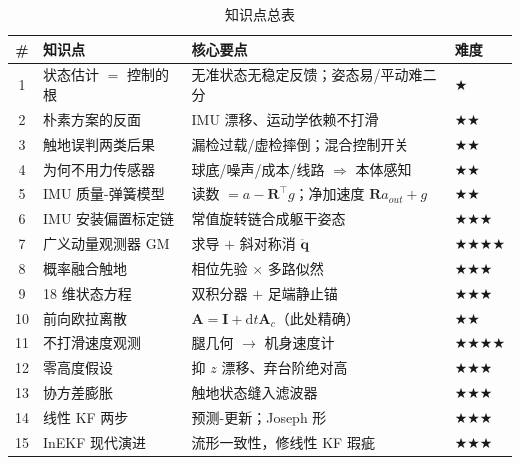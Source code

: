 \begin{table}[H]\centering\small
\caption{知识点总表}
\begin{tabular}{clll}
\toprule
\# & 知识点 & 核心要点 & 难度 \\
\midrule
1 & 状态估计 $=$ 控制的根 & 无准状态无稳定反馈；姿态易/平动难二分 & \(\bigstar\) \\
2 & 朴素方案的反面 & IMU 漂移、运动学依赖不打滑 & \(\bigstar\bigstar\) \\
3 & 触地误判两类后果 & 漏检过载/虚检摔倒；混合控制开关 & \(\bigstar\bigstar\) \\
4 & 为何不用力传感器 & 球底/噪声/成本/线路 $\Rightarrow$ 本体感知 & \(\bigstar\bigstar\) \\
5 & IMU 质量-弹簧模型 & 读数 $=a-\mathbf{R}^\top g$；净加速度 $\mathbf{R}a_{out}+g$ & \(\bigstar\bigstar\) \\
6 & IMU 安装偏置标定链 & 常值旋转链合成躯干姿态 & \(\bigstar\bigstar\bigstar\) \\
7 & 广义动量观测器 GM & 求导 $+$ 斜对称消 $\ddot{\boldsymbol q}$ & \(\bigstar\bigstar\bigstar\bigstar\) \\
8 & 概率融合触地 & 相位先验 $\times$ 多路似然 & \(\bigstar\bigstar\bigstar\) \\
9 & 18 维状态方程 & 双积分器 $+$ 足端静止锚 & \(\bigstar\bigstar\bigstar\) \\
10 & 前向欧拉离散 & $\mathbf{A}=\mathbf{I}+\mathrm{d}t\mathbf{A}_c$（此处精确） & \(\bigstar\bigstar\) \\
11 & 不打滑速度观测 & 腿几何 $\to$ 机身速度计 & \(\bigstar\bigstar\bigstar\bigstar\) \\
12 & 零高度假设 & 抑 $z$ 漂移、弃台阶绝对高 & \(\bigstar\bigstar\bigstar\) \\
13 & 协方差膨胀 & 触地状态缝入滤波器 & \(\bigstar\bigstar\bigstar\) \\
14 & 线性 KF 两步 & 预测-更新；Joseph 形 & \(\bigstar\bigstar\bigstar\) \\
15 & InEKF 现代演进 & 流形一致性，修线性 KF 瑕疵 & \(\bigstar\bigstar\bigstar\) \\
\bottomrule
\end{tabular}
\end{table}

